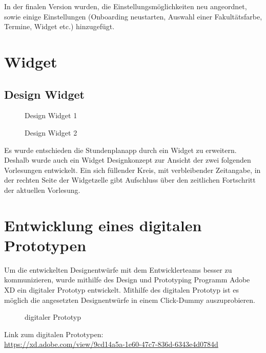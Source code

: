 In der finalen Version wurden, die Einstellungsmöglichkeiten neu angeordnet, sowie einige Einstellungen (Onboarding neustarten, Auswahl einer Fakultätsfarbe, Termine, Widget etc.) hinzugefügt.

\section{Widget}

\subsection{Design Widget}
\begin{figure}[H]
	\centering
	\caption{Design  Widget 1}
	\label{fig1}
\end{figure}

\begin{figure}[H]
	\centering
	\caption{Design Widget 2}
	\label{fig1}
\end{figure}

Es wurde entschieden die Stundenplanapp durch ein Widget zu erweitern. Deshalb wurde auch ein Widget Designkonzept zur Ansicht der zwei folgenden Vorlesungen entwickelt. Ein sich füllender Kreis, mit verbleibender Zeitangabe, in der rechten Seite der Widgetzelle gibt Aufschluss über den zeitlichen Fortschritt der aktuellen Vorlesung.


\section{Entwicklung eines digitalen Prototypen}
Um die entwickelten Designentwürfe mit dem Entwicklerteams besser zu kommunizieren, wurde mithilfe des Design und Prototyping Programm Adobe XD ein digitaler Prototyp entwickelt. Mithilfe des digitalen Prototyp ist es möglich die angesetzten Designentwürfe in einem Click-Dummy auszuprobieren.

\begin{figure}[H]
	\centering
	\caption{digitaler Prototyp}
	\label{fig1}
\end{figure}

Link zum digitalen Prototypen:\\
\url{https://xd.adobe.com/view/9cd14a5a-1e60-47c7-836d-6343e4d0784d}

